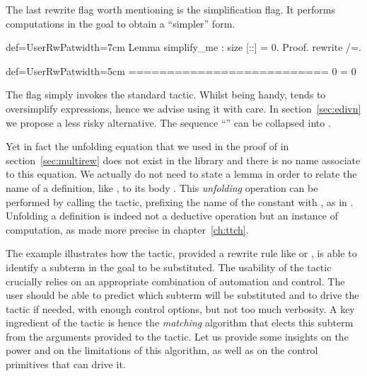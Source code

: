 
The last rewrite flag worth mentioning is the \C{/=} simplification
flag.  It performs computations in the goal to obtain a ``simpler'' form.

\begin{coq}{def=UserRwPat}{width=7cm}
Lemma simplify_me : size [::] = 0.
Proof.
rewrite /=.
\end{coq}
\begin{coqout}{def=UserRwPat}{width=5cm}
==========================
0 = 0
\end{coqout}
The \C{/=} flag simply invokes the \Coq{} standard 
tactic.  Whilst being handy,  tends to oversimplify
expressions, hence we advise using it with care.
In section~\ref{sec:edivn} we propose a less risky alternative.
The sequence ``\C{// /=}'' can be collapsed into \C{//=}.

Yet in fact the unfolding equation  that we used in
the proof of  in section~\ref{sec:multirew}
does not exist in the library and there is no name associate to this
equation. We actually do not need to state a lemma in order to relate
the name of a definition, like , to its body
. This \emph{unfolding} operation can be
performed by calling the  tactic, prefixing the name of the
constant with \C{/}, as in . Unfolding a definition is
indeed not a deductive operation but an instance of computation, as
made more precise in chapter~\ref{ch:ttch}.

\label{sec:rewrite2}

The example  illustrates how the  tactic, provided a
rewrite rule like  or , is able
to identify a
subterm in the goal to be substituted. The usability of the
tactic crucially relies on an appropriate combination of automation
and control. The user should be able to predict which subterm will be
substituted and to drive the tactic if needed, with enough control
options, but not too much verbosity. A key ingredient of the
 tactic is hence the \emph{matching} algorithm that
elects this subterm from the arguments provided to the tactic. Let us
provide some insights on the power and on the limitations of this
algorithm, as well as on the control primitives that can drive it.

